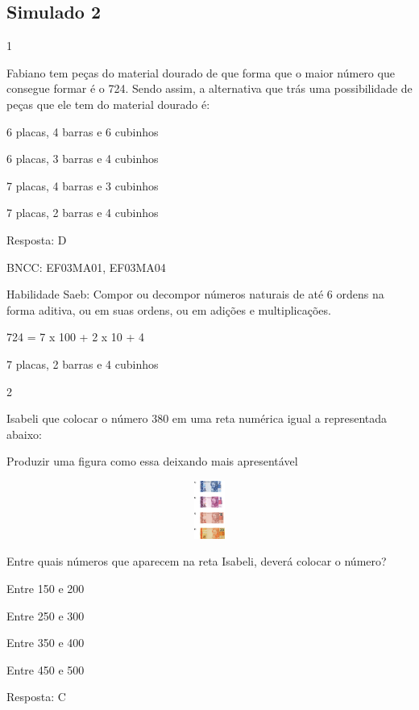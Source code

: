 \begin{escolha}
{\begin{escolha}
{\chapter{Simulado 2}

\num{1}

Fabiano tem peças do material dourado de que forma que o maior número
que consegue formar é o 724. Sendo assim, a alternativa que trás uma
possibilidade de peças que ele tem do material dourado é:

\begin{escolha}
\item
  6 placas, 4 barras e 6 cubinhos
\item
  6 placas, 3 barras e 4 cubinhos
\item
  7 placas, 4 barras e 3 cubinhos
\item
  7 placas, 2 barras e 4 cubinhos
\end{escolha}

Resposta: D

BNCC: EF03MA01, EF03MA04

Habilidade Saeb: Compor ou decompor números naturais de até 6 ordens na
forma aditiva, ou em suas ordens, ou em adições e multiplicações.

724 = 7 x 100 + 2 x 10 + 4

7 placas, 2 barras e 4 cubinhos

\num{2}

Isabeli que colocar o número 380 em uma reta numérica igual a
representada abaixo:

Produzir uma figura como essa deixando mais apresentável

\includegraphics[width=5.90556in,height=0.74931in]{media/image117.png}

Entre quais números que aparecem na reta Isabeli, deverá colocar o
número?

\begin{escolha}
\item
  Entre 150 e 200
\item
  Entre 250 e 300
\item
  Entre 350 e 400
\item
  Entre 450 e 500
\end{escolha}

Resposta: C

}
\end{escolha}}
\end{escolha}
